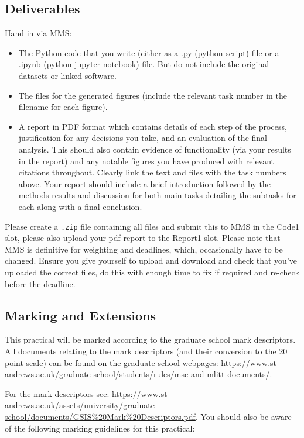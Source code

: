 \documentclass[a4paper,11pt]{article}
\begin{document}
\subsection*{Deliverables}

Hand in via MMS:

\begin{itemize}
\item The Python code that you write (either as a .py (python script) file or a .ipynb (python jupyter notebook) file. But do not include the original datasets or linked software.
\item The files for the generated figures (include the relevant task number in the filename for each figure).
\item A report in PDF format which contains details of each step of the process, justification for any decisions you take, and an evaluation of the final analysis. This should also contain evidence of functionality (via your results in the report) and any notable figures you have produced with relevant citations throughout. Clearly link the text and files with the task numbers above. Your report should include a brief introduction followed by the methods results and discussion for both main tasks detailing the subtasks for each along with a final conclusion.
\end{itemize}

\noindent
Please create a \texttt{.zip} file containing all files and submit this to MMS in the Code1 slot, please also upload your pdf report to the Report1 slot. Please note that MMS is definitive for weighting and deadlines, which, occasionally have to be changed. Ensure you give yourself to upload and download and check that you've uploaded the correct files, do this with enough time to fix if required and re-check before the deadline.

\subsection*{Marking and Extensions}

This practical will be marked according to the graduate school mark descriptors. All documents relating to the mark descriptors (and their conversion to the 20 point scale) can be found on the graduate school webpages: \url{https://www.st-andrews.ac.uk/graduate-school/students/rules/msc-and-mlitt-documents/}.

For the mark descriptors see: \url{https://www.st-andrews.ac.uk/assets/university/graduate-school/documents/GSIS\%20Mark\%20Descriptors.pdf}. You should also be aware of the following marking guidelines for this practical:
\end{document}
